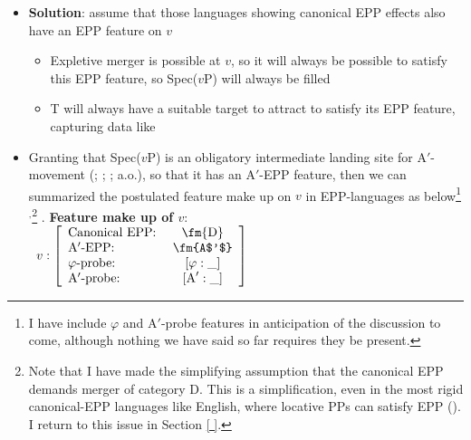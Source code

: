 \documentclass[letterpaper,10pt]{handout_nick}
\begin{document}
\begin{itemize}
\begin{itemize}
\end{itemize} 
\item \textbf{Solution}: assume that those languages showing canonical EPP effects also have an EPP feature on $v$ 
\begin{itemize}
\item Expletive merger is possible at $v$, so it will always be possible to satisfy this EPP feature, so Spec($v$P) will always be filled
\item T will always have a suitable target to attract to satisfy its EPP feature, capturing data like \Last
\end{itemize}
\item Granting that Spec($v$P) is an obligatory intermediate landing site for A$'$-movement (\citealt{chomsky86}; \citealt{fox99}; \citealt{chomsky01}; a.o.), so that it has an A$'$-EPP feature, then we can summarized the postulated feature make up on $v$ in EPP-languages as below\footnote{I have include $\varphi$ and A$'$-probe features in anticipation of the discussion to come, although nothing we have said so far requires they be present.}$^,$\footnote{Note that I have made the simplifying assumption that the canonical EPP demands merger of category D. This is a simplification, even in the most rigid canonical-EPP languages like English, where locative PPs can satisfy EPP (\citealt{bresnan89}). I return to this issue in Section \ref{ }.}
\ex. \textbf{Feature make up of $v$}:\\
\ $v: \left[\begin{array}{lc} \text{Canonical EPP: } & \text{\fm{D}}\\
\text{A$'$-EPP:} & \text{\fm{A$'$}}\\
\text{$\varphi$-probe:} & [\varphi:\_]\\
\text{A$'$-probe:} & [\text{A}':\_]
\end{array} \right]$


\end{itemize}
\end{document}
